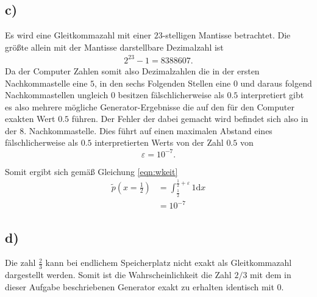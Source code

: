 \subsection{c)}
\label{subsec:a1c}
Es wird eine Gleitkommazahl mit einer $23$-stelligen Mantisse betrachtet.
Die größte allein mit der Mantisse darstellbare Dezimalzahl ist
\\
\begin{align*}
  2^{23} - 1 = 8388607.
\end{align*}
Da der Computer Zahlen somit also Dezimalzahlen die in der ersten Nachkommastelle eine $5$, in den sechs
Folgenden Stellen eine $0$ und daraus folgend Nachkommastellen ungleich $0$ besitzen fälschlicherweise als
$0.5$ interpretiert gibt es also mehrere mögliche Generator-Ergebnisse die auf den für den Computer exakten Wert
$0.5$ führen. Der Fehler der dabei gemacht wird befindet sich also in der $8.$ Nachkommastelle. Dies führt auf
einen maximalen Abstand eines fälschlicherweise als $0.5$ interpretierten Werts von der Zahl $0.5$ von
\\
\begin{equation}
  \label{eqn:abstand}
  \varepsilon = 10^{-7}.
\end{equation}

 Somit ergibt sich gemäß Gleichung \eqref{eqn:wkeit}
 \\
 \begin{align*}
   \tilde{p}\left( x = \frac{1}{2}\right) &= \int_{\frac{1}{2}}^{\frac{1}{2} + \varepsilon} 1 \mathrm{d}x\\
   &= 10^{-7}
 \end{align*}


\subsection{d)}
\label{subsec:a1d}
Die zahl $\frac{2}{3}$ kann bei endlichem Speicherplatz nicht exakt als Gleitkommazahl dargestellt werden.
Somit ist die Wahrscheinlichkeit die Zahl $2/3$ mit dem in dieser Aufgabe beschriebenen Generator exakt zu erhalten
identisch mit $0$.
